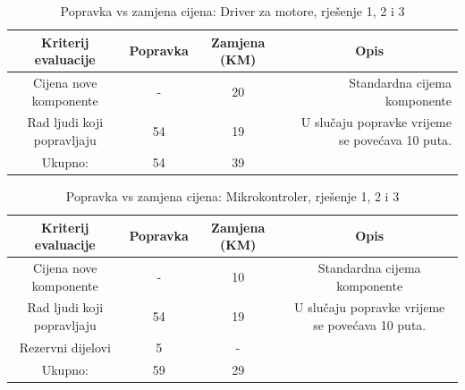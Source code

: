 \documentclass[12pt]{article}
\begin{document}
\begin{landscape}
\vspace*{\fill}
\begin{table}[htbp]
\footnotesize
  \centering
  \caption{Popravka vs zamjena cijena: Driver za motore, rješenje 1, 2 i 3}
    \begin{tabular}{cccr}
    \toprule
    Kriterij evaluacije & Popravka & Zamjena (KM) & \multicolumn{1}{c}{Opis} \\
    \midrule
     Cijena nove komponente & -     & 20    & \multicolumn{1}{p{19.57em}}{Standardna \newline{}cijema\newline{} komponente} \\
    \midrule
    Rad ljudi koji popravljaju & 54    & 19    & \multicolumn{1}{p{19.57em}}{ U slučaju popravke vrijeme se povećava 10 puta. } \\
    \midrule
    Ukupno: & 54    & 39    &  \\
    \bottomrule
    \end{tabular}%
  \label{tab:addlabel}%
\end{table}%

\begin{table}[htbp]
  \centering
\footnotesize
  \caption{Popravka vs zamjena cijena: Mikrokontroler, rješenje 1, 2 i 3}
    \begin{tabular}{cccc}
    \toprule
    Kriterij evaluacije & Popravka & Zamjena (KM) & Opis \\
    \midrule
     Cijena nove komponente & -     & 10    & \multicolumn{1}{p{19.57em}}{Standardna \newline{}cijema\newline{} komponente} \\
    \midrule
    Rad ljudi koji popravljaju & 54    & 19    & \multicolumn{1}{p{19.57em}}{ U slučaju popravke vrijeme se povećava 10 puta. } \\
    \midrule
    Rezervni dijelovi & 5     & -     &  \\
    \midrule
    Ukupno: & 59    & 29    &  \\
    \bottomrule
    \end{tabular}%
  \label{tab:addlabel}%
\end{table}%
\vspace*{\fill}
\end{landscape}
\end{document}
